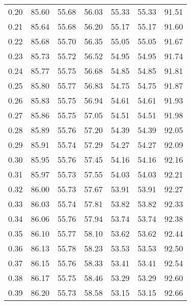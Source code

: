 \begin{tabular}{|c|c|c|c|c|c|c|}
      0.20 &     85.60 &     55.68 &      56.03 &   55.33 &      55.33 &         91.51 \\
      0.21 &     85.64 &     55.68 &      56.20 &   55.17 &      55.17 &         91.60 \\
      0.22 &     85.68 &     55.70 &      56.35 &   55.05 &      55.05 &         91.67 \\
      0.23 &     85.73 &     55.72 &      56.52 &   54.95 &      54.95 &         91.74 \\
      0.24 &     85.77 &     55.75 &      56.68 &   54.85 &      54.85 &         91.81 \\
      0.25 &     85.80 &     55.77 &      56.83 &   54.75 &      54.75 &         91.87 \\
      0.26 &     85.83 &     55.75 &      56.94 &   54.61 &      54.61 &         91.93 \\
      0.27 &     85.86 &     55.75 &      57.05 &   54.51 &      54.51 &         91.98 \\
      0.28 &     85.89 &     55.76 &      57.20 &   54.39 &      54.39 &         92.05 \\
      0.29 &     85.91 &     55.74 &      57.29 &   54.27 &      54.27 &         92.09 \\
      0.30 &     85.95 &     55.76 &      57.45 &   54.16 &      54.16 &         92.16 \\
      0.31 &     85.97 &     55.73 &      57.55 &   54.03 &      54.03 &         92.21 \\
      0.32 &     86.00 &     55.73 &      57.67 &   53.91 &      53.91 &         92.27 \\
      0.33 &     86.03 &     55.74 &      57.81 &   53.82 &      53.82 &         92.33 \\
      0.34 &     86.06 &     55.76 &      57.94 &   53.74 &      53.74 &         92.38 \\
      0.35 &     86.10 &     55.77 &      58.10 &   53.62 &      53.62 &         92.44 \\
      0.36 &     86.13 &     55.78 &      58.23 &   53.53 &      53.53 &         92.50 \\
      0.37 &     86.15 &     55.76 &      58.33 &   53.41 &      53.41 &         92.54 \\
      0.38 &     86.17 &     55.75 &      58.46 &   53.29 &      53.29 &         92.60 \\
      0.39 &     86.20 &     55.73 &      58.58 &   53.15 &      53.15 &         92.66 \\

\end{tabular}
